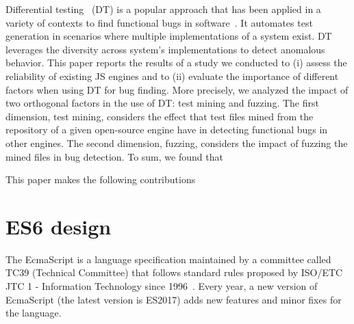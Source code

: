 \documentclass[10pt,conference,anonymous]{IEEEtran}
\begin{document}
Differential testing~\cite{Brumley-etal-ss07} (DT) is a popular
approach that has been applied in a variety of contexts to find
functional bugs in
software~\cite{Yang-etal-pldi11,Chen-etal-fse2015,Argyros-etla-ccs16,Chen-etal-pldi16,petsios-etal-sp2017,SivakornAPKJ17}. It
automates test generation in scenarios where multiple implementations
of a system exist. DT leverages the diversity across system's
implementations to detect anomalous behavior.
This paper reports the results of a study we conducted to (i) assess
the reliability of existing JS engines and to (ii) evaluate the
importance of different factors when using DT for bug finding. More
precisely, we analyzed the impact of two orthogonal factors in the use
of DT: test mining and fuzzing. The first dimension, test mining,
considers the effect that \js{} test files mined from the repository
of a given open-source engine have in detecting functional bugs in
other engines. The second dimension, fuzzing, considers the impact of
fuzzing the mined files in bug detection.
To sum, we found that 

This paper makes the following contributions 

\section{ES6 design}
\label{sec:es6-design}
The EcmaScript is a language specification maintained by 
a committee called TC39 (Technical Committee) that follows 
standard rules proposed by ISO/ETC JTC 1 - 
Information Technology since 1996~\cite{es6-website}.
Every year, a new version of EcmaScript (the latest version is ES2017) adds
new features and minor fixes for the language. 

   

\end{document}
